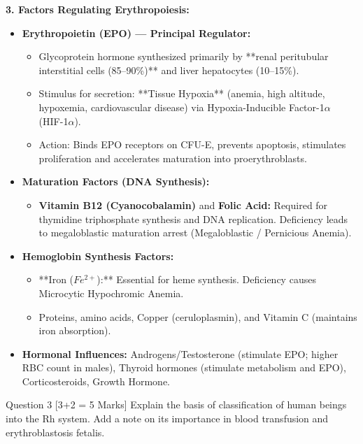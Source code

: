 \documentclass[11pt,a4paper]{article}
\begin{document}
\begin{ansbox}
\textbf{3. Factors Regulating Erythropoiesis:}
\begin{itemize}[leftmargin=*]
    \item \textbf{Erythropoietin (EPO) --- Principal Regulator:}
    \begin{itemize}
        \item Glycoprotein hormone synthesized primarily by **renal peritubular interstitial cells (85--90\%)** and liver hepatocytes (10--15\%).
        \item Stimulus for secretion: **Tissue Hypoxia** (anemia, high altitude, hypoxemia, cardiovascular disease) via Hypoxia-Inducible Factor-1$\alpha$ (HIF-1$\alpha$).
        \item Action: Binds EPO receptors on CFU-E, prevents apoptosis, stimulates proliferation and accelerates maturation into proerythroblasts.
    \end{itemize}
    \item \textbf{Maturation Factors (DNA Synthesis):}
    \begin{itemize}
        \item \textbf{Vitamin B12 (Cyanocobalamin)} and \textbf{Folic Acid:} Required for thymidine triphosphate synthesis and DNA replication. Deficiency leads to megaloblastic maturation arrest (Megaloblastic / Pernicious Anemia).
    \end{itemize}
    \item \textbf{Hemoglobin Synthesis Factors:}
    \begin{itemize}
        \item **Iron ($Fe^{2+}$):** Essential for heme synthesis. Deficiency causes Microcytic Hypochromic Anemia.
        \item Proteins, amino acids, Copper (ceruloplasmin), and Vitamin C (maintains iron absorption).
    \end{itemize}
    \item \textbf{Hormonal Influences:} Androgens/Testosterone (stimulate EPO; higher RBC count in males), Thyroid hormones (stimulate metabolism and EPO), Corticosteroids, Growth Hormone.
\end{itemize}
\end{ansbox}

\begin{qbox}{Question 3 [3+2 = 5 Marks]}
Explain the basis of classification of human beings into the Rh system. Add a note on its importance in blood transfusion and erythroblastosis fetalis.
\end{qbox}
\end{document}
